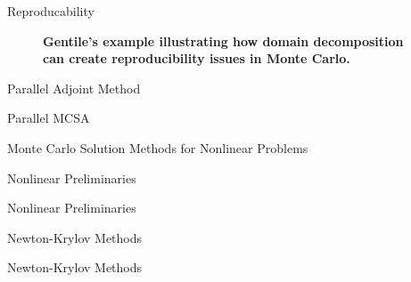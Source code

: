 \documentclass{beamer}
\begin{document}
\begin{frame}{Reproducability}

  \begin{figure}[htpb!]
    \begin{center}
      \scalebox{1.0}{
         }
    \end{center}
    \caption{\textbf{Gentile's example illustrating how domain
        decomposition can create reproducibility issues in Monte Carlo.}}
    \label{fig:gentile_example}
  \end{figure}

\end{frame}

\begin{frame}{Parallel Adjoint Method}

\end{frame}

\begin{frame}{Parallel MCSA}

\end{frame}

\begin{frame}{Monte Carlo Solution Methods for Nonlinear Problems}

\end{frame}

\begin{frame}{Nonlinear Preliminaries}

\end{frame}

\begin{frame}{Nonlinear Preliminaries}

\end{frame}

\begin{frame}{Newton-Krylov Methods}

\end{frame}

\begin{frame}{Newton-Krylov Methods}

\end{frame}
\end{document}
